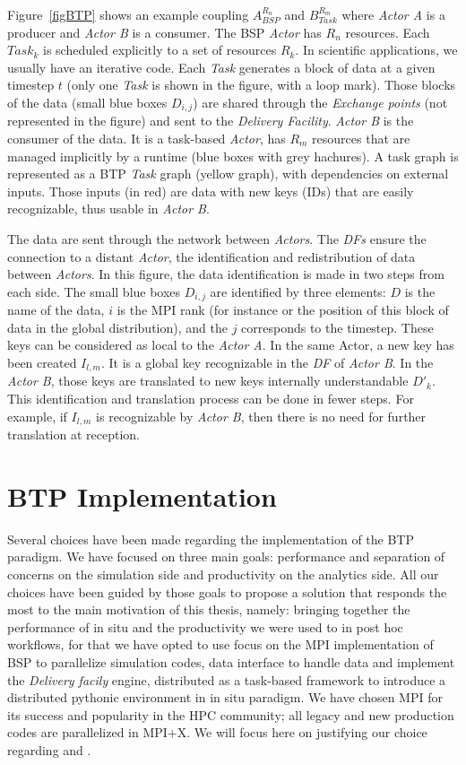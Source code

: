 Figure~\ref{figBTP} shows an example coupling $A_{BSP}^{R_{n}}$ and $B_{Task}^{R_{m}}$ where \textit{Actor A} is a producer and \textit{Actor B} is a consumer. The BSP \textit{Actor} has $R_{n}$ resources. Each $Task_k$ is scheduled explicitly to a set of resources $R_{k}$. In scientific applications, we usually have an iterative code. Each \textit{Task} generates a block of data at a given timestep $t$ (only one \textit{Task} is shown in the figure, with a loop mark). Those blocks of the data (small blue boxes $D_{i,j}$) are shared through the \textit{Exchange points} (not represented in the figure) and sent to the \textit{Delivery Facility}.
\textit{Actor B} is the consumer of the data. It is a task-based \textit{Actor}, has $R_{m}$ resources that are managed implicitly by a runtime (blue boxes with grey hachures). A task graph is represented as a BTP \textit{Task} graph (yellow graph), with dependencies on external inputs. Those inputs (in red) are data with new keys (IDs) that are easily recognizable, thus usable in \textit{Actor B}.  

The data are sent through the network between \textit{Actors}. The \textit{DFs} ensure the connection to a distant \textit{Actor}, the identification and redistribution of data between \textit{Actors}. 
In this figure, the data identification is made in two steps from each side. The small blue boxes $D_{i,j}$ are identified by three elements: $D$ is the name of the data, $i$ is the MPI rank (for instance or the position of this block of data in the global distribution), and the $j$ corresponds to the timestep. These keys can be considered as local to the \textit{Actor A}. 
In the same Actor, a new key has been created $I_{l,m}$. It is a global key recognizable in the \textit{DF} of \textit{Actor B}. In the \textit{Actor B}, those keys are translated to new keys internally understandable $D'_{k}$. 
This identification and translation process can be done in fewer steps. For example, if $I_{l,m}$ is recognizable by \textit{Actor B}, then there is no need for further translation at reception.

\section{BTP Implementation}\label{sec:btpimplementation}
Several choices have been made regarding the implementation of the BTP paradigm. We have focused on three main goals: performance and separation of concerns on the simulation side and productivity on the analytics side. All our choices have been guided by those goals to propose a solution that responds the most to the main motivation of this thesis, namely: bringing together the performance of in situ and the productivity we were used to in post hoc workflows, for that we have opted to use focus on the MPI implementation of BSP to parallelize simulation codes, \pdi data interface to handle data and implement the \textit{Delivery facily} engine, \dask distributed as a task-based framework to introduce a distributed pythonic environment in in situ paradigm. 
We have chosen MPI for its success and popularity in the HPC community; all legacy and new production codes are parallelized in MPI+X. We will focus here on justifying our choice regarding \pdi and \dask.

